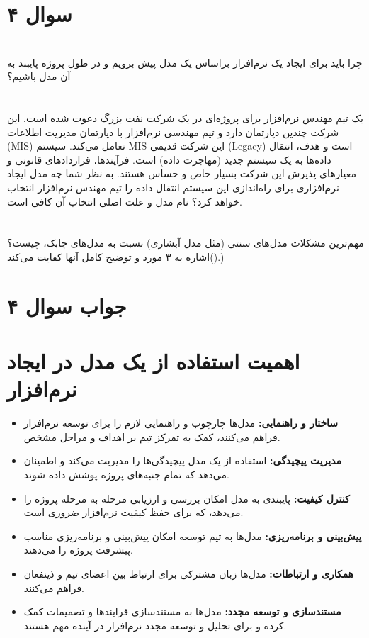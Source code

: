 \section*{سوال ۴}

\section*{}
 چرا باید برای ایجاد یک نرم‌افزار براساس یک مدل پیش برویم و در طول پروژه پایبند به آن مدل باشیم؟

\section*{}
یک تیم مهندس نرم‌افزار برای پروژه‌ای در یک شرکت نفت بزرگ دعوت شده است. این شرکت چندین دپارتمان دارد و تیم مهندسی نرم‌افزار با دپارتمان مدیریت اطلاعات (MIS) تعامل می‌کند. سیستم MIS این شرکت قدیمی (Legacy) است و هدف، انتقال داده‌ها به یک سیستم جدید (مهاجرت داده) است. فرآیندها، قراردادهای قانونی و معیارهای پذیرش این شرکت بسیار خاص و حساس هستند. به نظر شما چه مدل ایجاد نرم‌افزاری برای راه‌اندازی این سیستم انتقال داده را تیم مهندس نرم‌افزار انتخاب خواهد کرد؟ نام مدل و علت اصلی انتخاب آن کافی است.

\section*{}
مهم‌ترین مشکلات مدل‌های سنتی (مثل مدل آبشاری) نسبت به مدل‌های چابک، چیست؟ ()اشاره به ۳ مورد و توضیح کامل آنها کفایت می‌کند.)

\section*{جواب سوال ۴}

\section*{ اهمیت استفاده از یک مدل در ایجاد نرم‌افزار}

\begin{itemize}
	\item \textbf{ساختار و راهنمایی:} مدل‌ها چارچوب و راهنمایی لازم را برای توسعه نرم‌افزار فراهم می‌کنند، کمک به تمرکز تیم بر اهداف و مراحل مشخص.
	\item \textbf{مدیریت پیچیدگی:} استفاده از یک مدل پیچیدگی‌ها را مدیریت می‌کند و اطمینان می‌دهد که تمام جنبه‌های پروژه پوشش داده شوند.
	\item \textbf{کنترل کیفیت:} پایبندی به مدل امکان بررسی و ارزیابی مرحله به مرحله پروژه را می‌دهد، که برای حفظ کیفیت نرم‌افزار ضروری است.
	\item \textbf{پیش‌بینی و برنامه‌ریزی:} مدل‌ها به تیم توسعه امکان پیش‌بینی و برنامه‌ریزی مناسب پیشرفت پروژه را می‌دهند.
	\item \textbf{همکاری و ارتباطات:} مدل‌ها زبان مشترکی برای ارتباط بین اعضای تیم و ذینفعان فراهم می‌کنند.
	\item \textbf{مستندسازی و توسعه مجدد:} مدل‌ها به مستندسازی فرایندها و تصمیمات کمک کرده و برای تحلیل و توسعه مجدد نرم‌افزار در آینده مهم هستند.
\end{itemize}

